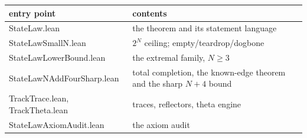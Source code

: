 \documentclass[11pt]{article}
\theoremstyle{definition}
\newcommand{\file}[1]{\textsf{#1}}
\begin{document}
\begin{center}
\begin{tabular}{@{}p{}p{}@{}}
  \toprule
  entry point & contents\\
  \midrule
  \file{StateLaw.lean} & the theorem and its statement language\\
  \file{StateLawSmallN.lean} & $2^N$ ceiling; empty/teardrop/dogbone\\
  \file{StateLawLowerBound.lean} & the extremal family, $N \ge 3$\\
  \file{StateLawNAddFourSharp.lean} & total completion, the known-edge theorem and the sharp $N+4$ bound\\
  \file{TrackTrace.lean}, \file{TrackTheta.lean} & traces, reflectors,
    theta engine\\
  \file{StateLawAxiomAudit.lean} & the axiom audit\\
  \bottomrule
\end{tabular}
\end{center}
\end{document}
